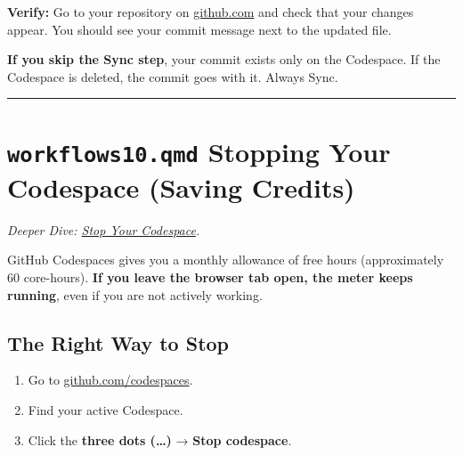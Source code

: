 \documentclass[
  letterpaper,
  DIV=11,
  numbers=noendperiod,
  oneside]{scrreprt}
\providecommand{\tightlist}{%
  \setlength{\itemsep}{0pt}\setlength{\parskip}{0pt}}
\begin{document}
\textbf{Verify:} Go to your repository on
\href{https://github.com}{github.com} and check that your changes
appear. You should see your commit message next to the updated file.

\begin{tcolorbox}[enhanced jigsaw, title=\textcolor{quarto-callout-warning-color}{\faExclamationTriangle}\hspace{0.5em}{Warning}, arc=.35mm, toptitle=1mm, colframe=quarto-callout-warning-color-frame, toprule=.15mm, leftrule=.75mm, bottomtitle=1mm, opacityback=0, bottomrule=.15mm, coltitle=black, breakable, opacitybacktitle=0.6, titlerule=0mm, colback=white, left=2mm, colbacktitle=quarto-callout-warning-color!10!white, rightrule=.15mm]

\textbf{If you skip the Sync step}, your commit exists only on the
Codespace. If the Codespace is deleted, the commit goes with it. Always
Sync.

\end{tcolorbox}

\begin{center}\rule{0.5\linewidth}{0.5pt}\end{center}

\section*{\texorpdfstring{\texttt{workflows10.qmd} Stopping Your
Codespace (Saving
Credits)}{workflows10.qmd Stopping Your Codespace (Saving Credits)}}\label{workflows10.qmd-stopping-your-codespace-saving-credits}


\emph{Deeper Dive: \href{workflows10-stop-codespace.qmd}{Stop Your
Codespace}.}

GitHub Codespaces gives you a monthly allowance of free hours
(approximately 60 core-hours). \textbf{If you leave the browser tab
open, the meter keeps running}, even if you are not actively working.

\subsection*{The Right Way to Stop}\label{the-right-way-to-stop}

\begin{enumerate}
\def\labelenumi{\arabic{enumi}.}
\tightlist
\item
  Go to \href{https://github.com/codespaces}{github.com/codespaces}.
\item
  Find your active Codespace.
\item
  Click the \textbf{three dots (\ldots)} → \textbf{Stop codespace}.
\end{enumerate}
\end{document}
